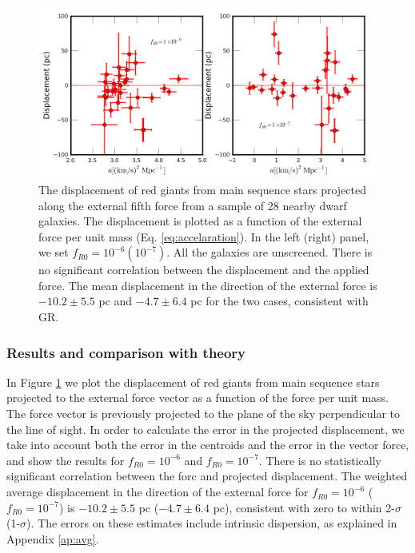 \documentclass[useAMS,usenatbib,twocolumn]{mn2e}
\newcommand{\jakesays}[1]{{\color{red}[Jake says: #1]}}
\begin{document}
\begin{figure}
\includegraphics[scale=0.5]{figures/dispprojforce.png}
  \caption{The displacement of red giants from main sequence stars projected along 
the external fifth force from a sample of 28 nearby dwarf galaxies. The displacement is plotted as a function of the external force per unit mass
(Eq. \ref{eq:accelaration}). 
In the left (right) panel, we set $f_{R0}=10^{-6} (10^{-7})$. 
All the galaxies are unscreened. There is no significant correlation between
the
displacement and the applied force.
 The mean displacement in the direction of the 
external force is $-10.2\pm5.5$ pc  and $-4.7\pm6.4$ pc for
the two cases, consistent with GR. 
\label{fig:rgdispprojforce}}
\end{figure}

\subsubsection{Results and comparison with theory}
In Figure \ref{fig:rgdispprojforce} we plot the displacement of red
giants from  main sequence stars projected to the external force vector as a 
function of the force per unit mass. The force vector is previously
projected to the plane of the sky perpendicular to the line of sight.
In order to calculate the error in the projected displacement, 
we take into account both the error in the centroids and the error in the
vector force, and show the results for $f_{R0}=10^{-6}$ and $f_{R0}=10^{-7}$.
There is no statistically significant correlation between the forc and
projected displacement.
The weighted average displacement in the direction of the 
external force for $f_{R0} = 10^{-6}$ ($f_{R0} = 10^{-7}$) is
$-10.2\pm5.5$ pc ($-4.7\pm6.4$ pc),
consistent with zero to within 2-$\sigma$ (1-$\sigma$).
The errors on these estimates include intrinsic dispersion, as explained
in Appendix \ref{ap:avg}.
\end{document}
